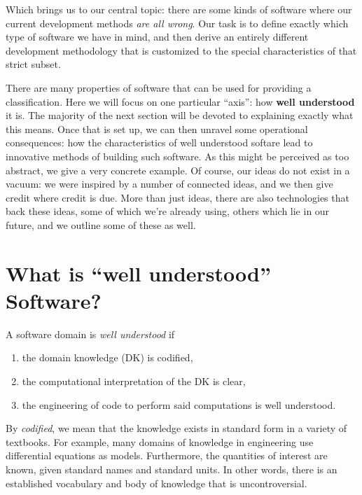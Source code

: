 \documentclass[sigconf,review]{acmart}
\begin{document}
Which brings us to our central topic: there are some kinds of software
where our current development methods \emph{are all wrong}. Our task
is to define exactly which type of software we have in mind, and then
derive an entirely different development methodology that is
customized to the special characteristics of that strict subset.

There are many properties of software that can be used for providing
a classification. Here we will focus on one particular ``axis'': how
\textbf{well understood} it is. The majority of the next section will
be devoted to explaining exactly what this means. Once that is set up,
we can then unravel some operational consequences: how the characteristics of
well understood softare lead to innovative methods of building such
software. As this might be perceived as too abstract, we give a very
concrete example. Of course, our ideas do not exist in a vacuum: we were
inspired by a number of connected ideas, and we then give credit where
credit is due. More than just ideas, there are also technologies that back
these ideas, some of which we're already using, others which lie in our
future, and we outline some of these as well. %

\section{What is ``well understood'' Software?}\label{ch:wellUnderstood}

\begin{defn}
A software domain is \emph{well understood} if
\begin{enumerate}
\item the domain knowledge (DK) is codified,
\item the computational interpretation of the DK is clear,
\item the engineering of code to perform said computations is well
understood.
\end{enumerate}
\end{defn}

By \emph{codified}, we mean that the knowledge exists in standard form in
a variety of textbooks. For example, many domains of knowledge in engineering
use differential equations as models. Furthermore, the quantities of interest
are known, given standard names and standard units. In other words, there is
an established vocabulary and body of knowledge that is uncontroversial.
\end{document}
